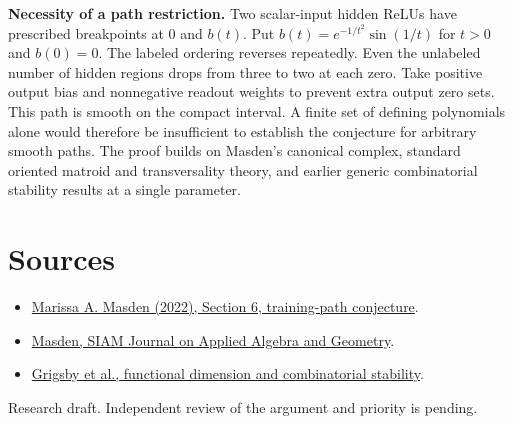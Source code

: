 \documentclass[10pt]{article}
\begin{document}
\textbf{Necessity of a path restriction.} Two scalar-input hidden ReLUs have prescribed breakpoints at $0$ and $b(t)$. Put $b(t)=e^{-1/t^2}\sin(1/t)$ for $t>0$ and $b(0)=0$. The labeled ordering reverses repeatedly. Even the unlabeled number of hidden regions drops from three to two at each zero. Take positive output bias and nonnegative readout weights to prevent extra output zero sets. This path is smooth on the compact interval. A finite set of defining polynomials alone would therefore be insufficient to establish the conjecture for arbitrary smooth paths. The proof builds on Masden's canonical complex, standard oriented matroid and transversality theory, and earlier generic combinatorial stability results at a single parameter.

\section*{Sources}
\begin{itemize}
\item \href{https://arxiv.org/abs/2207.07696}{Marissa A. Masden (2022), Section 6, training-path conjecture}.
\item \href{https://doi.org/10.1137/24M1646996}{Masden, SIAM Journal on Applied Algebra and Geometry}.
\item \href{https://arxiv.org/abs/2209.04036}{Grigsby et al., functional dimension and combinatorial stability}.
\end{itemize}
{\small Research draft. Independent review of the argument and priority is pending.}
\end{document}
